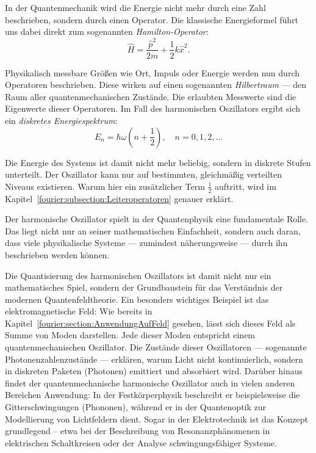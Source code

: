 In der Quantenmechanik wird die Energie nicht mehr durch eine Zahl beschrieben, sondern durch einen Operator.  
Die klassische Energieformel führt uns dabei direkt zum sogenannten \emph{Hamilton-Operator}:
\begin{equation}
\hat{H} = \frac{\hat{p}^2}{2m} + \frac{1}{2} k \hat{x}^2.
\label{fourier:equation:derQMHO}
\end{equation}

Physikalisch messbare Größen wie Ort, Impuls oder Energie werden nun durch Operatoren beschrieben.  
Diese wirken auf einen sogenannten \emph{Hilbertraum} — den Raum aller quantenmechanischen Zustände.  
Die erlaubten Messwerte sind die Eigenwerte dieser Operatoren.  
Im Fall des harmonischen Oszillators ergibt sich ein \emph{diskretes Energiespektrum}:
\[
E_n = \hbar \omega \left(n + \frac{1}{2} \right), \quad n = 0, 1, 2, \dots
\]

Die Energie des Systems ist damit nicht mehr beliebig, sondern in diskrete Stufen unterteilt.  
Der Oszillator kann nur auf bestimmten, gleichmäßig verteilten Niveaus existieren.
Warum hier ein zusätzlicher Term $\frac{1}{2}$ auftritt, wird im Kapitel~\ref{fourier:subsection:Leiteroperatoren} genauer erklärt.

Der harmonische Oszillator spielt in der Quantenphysik eine fundamentale Rolle.  
Das liegt nicht nur an seiner mathematischen Einfachheit, sondern auch daran, dass viele physikalische Systeme — zumindest näherungsweise — durch ihn beschrieben werden können.

Die Quantisierung des harmonischen Oszillators ist damit nicht nur ein mathematisches Spiel, sondern der Grundbaustein für das Verständnis der modernen Quantenfeldtheorie.
Ein besonders wichtiges Beispiel ist das elektromagnetische Feld:  
Wie bereits in Kapitel~\ref{fourier:section:AnwendungAufFeld} gesehen, lässt sich dieses Feld als Summe von Moden darstellen.  
Jede dieser Moden entspricht einem quantenmechanischen Oszillator.  
Die Zustände dieser Oszillatoren — sogenannte Photonenzahlenzustände — erklären, warum Licht nicht kontinuierlich, sondern in diskreten Paketen (Photonen) emittiert und absorbiert wird.
Darüber hinaus findet der quantenmechanische harmonische Oszillator auch in vielen anderen Bereichen Anwendung:
In der Festkörperphysik beschreibt er beispielsweise die Gitterschwingungen (Phononen), während er in der Quantenoptik zur Modellierung von Lichtfeldern dient.
Sogar in der Elektrotechnik ist das Konzept grundlegend – etwa bei der Beschreibung von Resonanzphänomenen in elektrischen Schaltkreisen oder der Analyse schwingungsfähiger Systeme.

